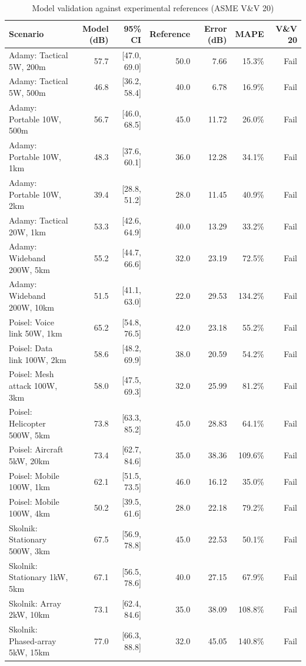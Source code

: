 \begin{table}[htbp]
\centering
\caption{Model validation against experimental references (ASME V\&V 20)}
\label{tab:validation}
\begin{tabular}{lrrrrrr}
\toprule
Scenario & Model (dB) & 95\% CI & Reference & Error (dB) & MAPE & V\&V 20 \\
\midrule
Adamy: Tactical 5W, 200m & 57.7 & [47.0, 69.0] & 50.0 & 7.66 & 15.3\% & Fail \\
Adamy: Tactical 5W, 500m & 46.8 & [36.2, 58.4] & 40.0 & 6.78 & 16.9\% & Fail \\
Adamy: Portable 10W, 500m & 56.7 & [46.0, 68.5] & 45.0 & 11.72 & 26.0\% & Fail \\
Adamy: Portable 10W, 1km & 48.3 & [37.6, 60.1] & 36.0 & 12.28 & 34.1\% & Fail \\
Adamy: Portable 10W, 2km & 39.4 & [28.8, 51.2] & 28.0 & 11.45 & 40.9\% & Fail \\
Adamy: Tactical 20W, 1km & 53.3 & [42.6, 64.9] & 40.0 & 13.29 & 33.2\% & Fail \\
Adamy: Wideband 200W, 5km & 55.2 & [44.7, 66.6] & 32.0 & 23.19 & 72.5\% & Fail \\
Adamy: Wideband 200W, 10km & 51.5 & [41.1, 63.0] & 22.0 & 29.53 & 134.2\% & Fail \\
Poisel: Voice link 50W, 1km & 65.2 & [54.8, 76.5] & 42.0 & 23.18 & 55.2\% & Fail \\
Poisel: Data link 100W, 2km & 58.6 & [48.2, 69.9] & 38.0 & 20.59 & 54.2\% & Fail \\
Poisel: Mesh attack 100W, 3km & 58.0 & [47.5, 69.3] & 32.0 & 25.99 & 81.2\% & Fail \\
Poisel: Helicopter 500W, 5km & 73.8 & [63.3, 85.2] & 45.0 & 28.83 & 64.1\% & Fail \\
Poisel: Aircraft 5kW, 20km & 73.4 & [62.7, 84.6] & 35.0 & 38.36 & 109.6\% & Fail \\
Poisel: Mobile 100W, 1km & 62.1 & [51.5, 73.5] & 46.0 & 16.12 & 35.0\% & Fail \\
Poisel: Mobile 100W, 4km & 50.2 & [39.5, 61.6] & 28.0 & 22.18 & 79.2\% & Fail \\
Skolnik: Stationary 500W, 3km & 67.5 & [56.9, 78.8] & 45.0 & 22.53 & 50.1\% & Fail \\
Skolnik: Stationary 1kW, 5km & 67.1 & [56.5, 78.6] & 40.0 & 27.15 & 67.9\% & Fail \\
Skolnik: Array 2kW, 10km & 73.1 & [62.4, 84.6] & 35.0 & 38.09 & 108.8\% & Fail \\
Skolnik: Phased-array 5kW, 15km & 77.0 & [66.3, 88.8] & 32.0 & 45.05 & 140.8\% & Fail \\

\end{tabular}
\end{table}
